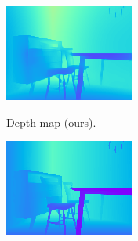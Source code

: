 

\begin{figure}[h]
  \centering
  \begin{subfigure}[b]{0.45\linewidth}
    \centering
    \includegraphics[width=\linewidth]{figs/depth_ours.png}
    \label{subfig:sub1}
   \vspace*{-3mm} %
  \caption{Depth map (ours).}
  \end{subfigure}
  \hfill
  \begin{subfigure}[b]{0.45\linewidth}
    \centering
    \includegraphics[width=\linewidth]{figs/depth_pan.png}

\end{subfigure}
\end{figure}
